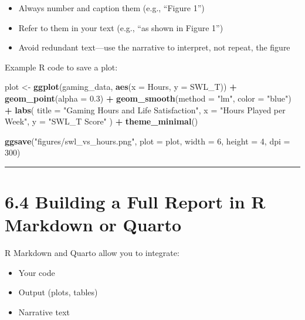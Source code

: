 \documentclass[
]{book}
\newenvironment{Shaded}{\begin{snugshade}}{\end{snugshade}}
\newcommand{\AttributeTok}[1]{\textcolor[rgb]{0.13,0.29,0.53}{#1}}
\newcommand{\DecValTok}[1]{\textcolor[rgb]{0.00,0.00,0.81}{#1}}
\newcommand{\FloatTok}[1]{\textcolor[rgb]{0.00,0.00,0.81}{#1}}
\newcommand{\FunctionTok}[1]{\textcolor[rgb]{0.13,0.29,0.53}{\textbf{#1}}}
\newcommand{\NormalTok}[1]{#1}
\newcommand{\OtherTok}[1]{\textcolor[rgb]{0.56,0.35,0.01}{#1}}
\newcommand{\SpecialCharTok}[1]{\textcolor[rgb]{0.81,0.36,0.00}{\textbf{#1}}}
\newcommand{\StringTok}[1]{\textcolor[rgb]{0.31,0.60,0.02}{#1}}
\providecommand{\tightlist}{%
  \setlength{\itemsep}{0pt}\setlength{\parskip}{0pt}}
\begin{document}
\begin{itemize}
\tightlist
\item
  Always number and caption them (e.g., ``Figure 1'')
\item
  Refer to them in your text (e.g., ``as shown in Figure 1'')
\item
  Avoid redundant text---use the narrative to interpret, not repeat, the figure
\end{itemize}

Example R code to save a plot:

\begin{Shaded}
\begin{Highlighting}[]
\NormalTok{plot }\OtherTok{\textless{}{-}} \FunctionTok{ggplot}\NormalTok{(gaming\_data, }\FunctionTok{aes}\NormalTok{(}\AttributeTok{x =}\NormalTok{ Hours, }\AttributeTok{y =}\NormalTok{ SWL\_T)) }\SpecialCharTok{+}
  \FunctionTok{geom\_point}\NormalTok{(}\AttributeTok{alpha =} \FloatTok{0.3}\NormalTok{) }\SpecialCharTok{+}
  \FunctionTok{geom\_smooth}\NormalTok{(}\AttributeTok{method =} \StringTok{"lm"}\NormalTok{, }\AttributeTok{color =} \StringTok{"blue"}\NormalTok{) }\SpecialCharTok{+}
  \FunctionTok{labs}\NormalTok{(}
    \AttributeTok{title =} \StringTok{"Gaming Hours and Life Satisfaction"}\NormalTok{,}
    \AttributeTok{x =} \StringTok{"Hours Played per Week"}\NormalTok{,}
    \AttributeTok{y =} \StringTok{"SWL\_T Score"}
\NormalTok{  ) }\SpecialCharTok{+}
  \FunctionTok{theme\_minimal}\NormalTok{()}

\FunctionTok{ggsave}\NormalTok{(}\StringTok{"figures/swl\_vs\_hours.png"}\NormalTok{, }\AttributeTok{plot =}\NormalTok{ plot, }\AttributeTok{width =} \DecValTok{6}\NormalTok{, }\AttributeTok{height =} \DecValTok{4}\NormalTok{, }\AttributeTok{dpi =} \DecValTok{300}\NormalTok{)}
\end{Highlighting}
\end{Shaded}

\begin{center}\rule{0.5\linewidth}{0.5pt}\end{center}

\section{6.4 Building a Full Report in R Markdown or Quarto}\label{building-a-full-report-in-r-markdown-or-quarto}

R Markdown and Quarto allow you to integrate:

\begin{itemize}
\tightlist
\item
  Your code
\item
  Output (plots, tables)
\item
  Narrative text
\end{itemize}
\end{document}
